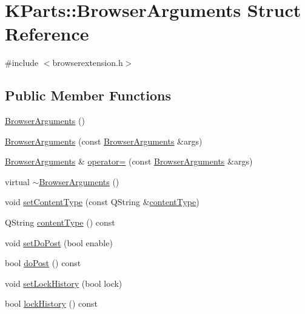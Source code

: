 \hypertarget{structKParts_1_1BrowserArguments}{\section{\-K\-Parts\-:\-:\-Browser\-Arguments \-Struct \-Reference}
\label{structKParts_1_1BrowserArguments}
}


{\ttfamily \#include $<$browserextension.\-h$>$}

\subsection*{\-Public \-Member \-Functions}
\begin{DoxyCompactItemize}
\item 
\hyperlink{structKParts_1_1BrowserArguments_a87b08664fe9d6dc90631f4a7c0d4a871}{\-Browser\-Arguments} ()
\item 
\hyperlink{structKParts_1_1BrowserArguments_a1a9790044d682d0346c03f9468d31aa5}{\-Browser\-Arguments} (const \hyperlink{structKParts_1_1BrowserArguments}{\-Browser\-Arguments} \&args)
\item 
\hyperlink{structKParts_1_1BrowserArguments}{\-Browser\-Arguments} \& \hyperlink{structKParts_1_1BrowserArguments_acd0d51024957675a322c5120ab8a9b89}{operator=} (const \hyperlink{structKParts_1_1BrowserArguments}{\-Browser\-Arguments} \&args)
\item 
virtual \hyperlink{structKParts_1_1BrowserArguments_a1f558d1e3fc7441f86346e82f4e6fcaf}{$\sim$\-Browser\-Arguments} ()
\item 
void \hyperlink{structKParts_1_1BrowserArguments_aa2a3384e7711f1a6fc6b710852d11bc4}{set\-Content\-Type} (const \-Q\-String \&\hyperlink{structKParts_1_1BrowserArguments_a11198af20bc7c8b9f5c165ed0ba1401b}{content\-Type})
\item 
\-Q\-String \hyperlink{structKParts_1_1BrowserArguments_a11198af20bc7c8b9f5c165ed0ba1401b}{content\-Type} () const 
\item 
void \hyperlink{structKParts_1_1BrowserArguments_a7c934a91eddfd3ddfb9e1fe0f4eace9f}{set\-Do\-Post} (bool enable)
\item 
bool \hyperlink{structKParts_1_1BrowserArguments_a8470520e769024497a32293e36bdd92f}{do\-Post} () const 
\item 
void \hyperlink{structKParts_1_1BrowserArguments_ad4ad5d94380a0548c5d3e53368f6f1f5}{set\-Lock\-History} (bool lock)
\item 
bool \hyperlink{structKParts_1_1BrowserArguments_a5292374726fba2faee5f9b44acd67c70}{lock\-History} () const 

\end{DoxyCompactItemize}
